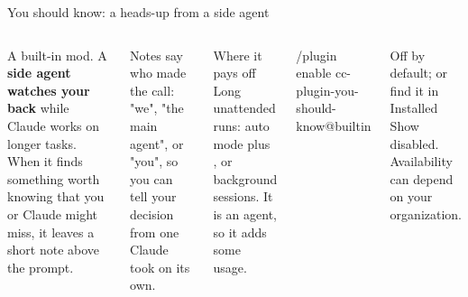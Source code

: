 \documentclass[aspectratio=169,11pt,t]{beamer}
\begin{document}
\begin{frame}[fragile]{You should know: a heads-up from a side agent}
  \begin{columns}[T,onlytextwidth]
      \small A built-in mod. A \textbf{side agent watches your back} while Claude works on longer tasks. When it finds something worth knowing that you or Claude might miss, it leaves a short note above the prompt.\par\vspace{0.4em}
      Notes say who made the call: "we", "the main agent", or "you", so you can tell your decision from one Claude took on its own.\par\vspace{0.4em}
      \begin{callout}[good]{Where it pays off}
        Long unattended runs: auto mode plus , or background sessions. It is an agent, so it adds some usage.
      \end{callout}
      \par\vspace{0.25em}
\begin{code}[basicstyle=\ttfamily\scriptsize\color{codefg}]
/plugin enable
  cc-plugin-you-should-know@builtin
\end{code}
      \footnotesize Off by default; or find it in  \ra{} Installed \ra{} Show disabled. Availability can depend on your organization.
  \end{columns}
\end{frame}
\end{document}
